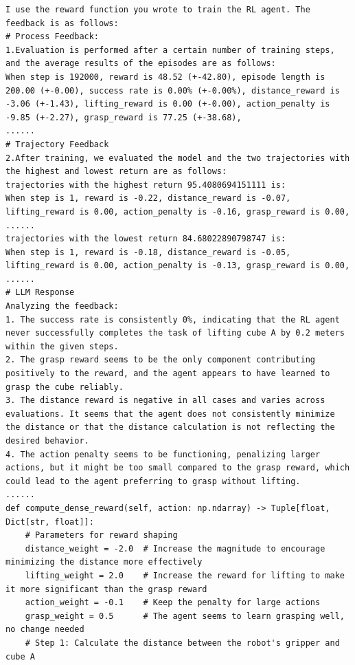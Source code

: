 \documentclass{article}
\theoremstyle{plain}
\theoremstyle{definition}
\theoremstyle{remark}
\begin{document}
\begin{table}[!ht]
\centering
\caption{The code generated after $1$ introspection iteration on \textit{Lift Cube}.}
\begin{tcolorbox}
\begin{lstlisting}[breaklines]
I use the reward function you wrote to train the RL agent. The feedback is as follows:
# Process Feedback:
1.Evaluation is performed after a certain number of training steps, and the average results of the episodes are as follows:
When step is 192000, reward is 48.52 (+-42.80), episode length is 200.00 (+-0.00), success rate is 0.00% (+-0.00%), distance_reward is -3.06 (+-1.43), lifting_reward is 0.00 (+-0.00), action_penalty is -9.85 (+-2.27), grasp_reward is 77.25 (+-38.68), 
......
# Trajectory Feedback
2.After training, we evaluated the model and the two trajectories with the highest and lowest return are as follows:
trajectories with the highest return 95.4080694151111 is:
When step is 1, reward is -0.22, distance_reward is -0.07, lifting_reward is 0.00, action_penalty is -0.16, grasp_reward is 0.00, 
......
trajectories with the lowest return 84.68022890798747 is:
When step is 1, reward is -0.18, distance_reward is -0.05, lifting_reward is 0.00, action_penalty is -0.13, grasp_reward is 0.00, 
......
# LLM Response
Analyzing the feedback:
1. The success rate is consistently 0%, indicating that the RL agent never successfully completes the task of lifting cube A by 0.2 meters within the given steps.
2. The grasp reward seems to be the only component contributing positively to the reward, and the agent appears to have learned to grasp the cube reliably.
3. The distance reward is negative in all cases and varies across evaluations. It seems that the agent does not consistently minimize the distance or that the distance calculation is not reflecting the desired behavior.
4. The action penalty seems to be functioning, penalizing larger actions, but it might be too small compared to the grasp reward, which could lead to the agent preferring to grasp without lifting.
......
def compute_dense_reward(self, action: np.ndarray) -> Tuple[float, Dict[str, float]]:
    # Parameters for reward shaping
    distance_weight = -2.0  # Increase the magnitude to encourage minimizing the distance more effectively
    lifting_weight = 2.0    # Increase the reward for lifting to make it more significant than the grasp reward
    action_weight = -0.1    # Keep the penalty for large actions
    grasp_weight = 0.5      # The agent seems to learn grasping well, no change needed
    # Step 1: Calculate the distance between the robot's gripper and cube A

\end{lstlisting}
\end{tcolorbox}
\end{table}
\end{document}
